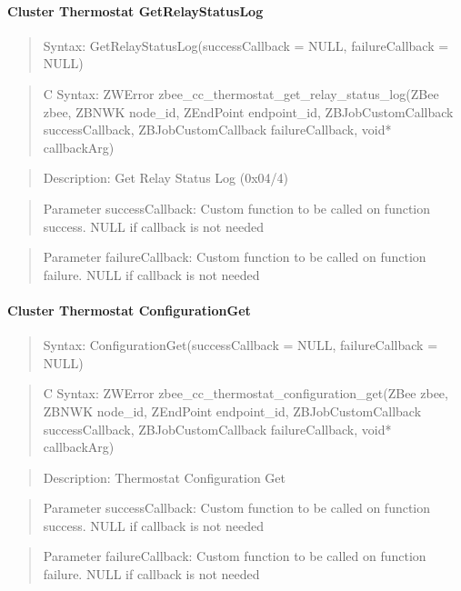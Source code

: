 \paragraph{Cluster Thermostat GetRelayStatusLog}
\begin{quote}Syntax: GetRelayStatusLog(successCallback = NULL, failureCallback = NULL)\end{quote}
\begin{quote}C Syntax: ZWError zbee\_cc\_thermostat\_get\_relay\_status\_log(ZBee zbee, ZBNWK node\_id, ZEndPoint endpoint\_id, ZBJobCustomCallback successCallback, ZBJobCustomCallback failureCallback, void* callbackArg)\end{quote}
\begin{quote}Description: Get Relay Status Log (0x04/4)\end{quote}
\begin{quote}Parameter successCallback: Custom function to be called on function success. NULL if callback is not needed\end{quote}
\begin{quote}Parameter failureCallback: Custom function to be called on function failure. NULL if callback is not needed\end{quote}


\paragraph{Cluster Thermostat ConfigurationGet}
\begin{quote}Syntax: ConfigurationGet(successCallback = NULL, failureCallback = NULL)\end{quote}
\begin{quote}C Syntax: ZWError zbee\_cc\_thermostat\_configuration\_get(ZBee zbee, ZBNWK node\_id, ZEndPoint endpoint\_id, ZBJobCustomCallback successCallback, ZBJobCustomCallback failureCallback, void* callbackArg)\end{quote}
\begin{quote}Description: Thermostat Configuration Get\end{quote}
\begin{quote}Parameter successCallback: Custom function to be called on function success. NULL if callback is not needed\end{quote}
\begin{quote}Parameter failureCallback: Custom function to be called on function failure. NULL if callback is not needed\end{quote}



